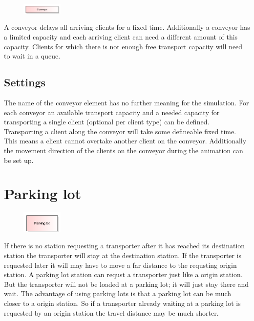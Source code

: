 \begin{figure}
\vspace{-22pt}
\includegraphics[width=2cm]{imageModelElementConveyor.png}
\vspace{-22pt}
\end{figure}

A conveyor delays all arriving clients for a fixed time.
Additionally a conveyor has a limited capacity and each
arriving client can need a different amount of this capacity.
Clients for which there is not enough free transport capacity
will need to wait in a queue.

\subsection*{Settings}

The name of the conveyor element has no further meaning for the simulation.
For each conveyor an available transport capacity and a needed capacity for
transporting a single client (optional per client type) can be defined.
Transporting a client along the conveyor will take some defineable fixed
time. This means a client cannot overtake another client on the conveyor.
Additionally the movement direction of the clients on the conveyor during
the animation can be set up.


\section{Parking lot}
\label{ref:ModelElementTransportParking}

\begin{figure}
\vspace{-22pt}
\includegraphics[width=2cm]{imageModelElementTransportParking.png}
\vspace{-22pt}
\end{figure}

If there is no station requesting a transporter after it has reached its
destination station the transporter will stay at the destination station. 
If the transporter is requested later it will may have to move a far distance
to the requsting origin station. A parking lot station can requst a transporter
just like a origin station. But the transporter will not be loaded at a parking lot;
it will just stay there and wait. The advantage of using parking lots is that
a parking lot can be much closer to a origin station. So if a transporter
already waiting at a parking lot is requested by an origin station the
travel distance may be much shorter.

